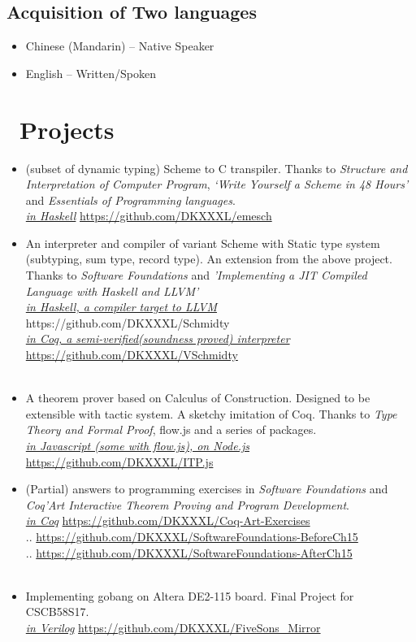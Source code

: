 \documentclass{resume}
\begin{document}
\subsection{\textbf{Acquisition of Two languages}}
\begin{itemize}
\item Chinese (Mandarin) – Native Speaker
\item English – Written/Spoken
\end{itemize}


\section{\faCogs\ Projects}
\begin{itemize}
\item (subset of dynamic typing) Scheme to C transpiler. Thanks to \textit{Structure and Interpretation of Computer Program}, \textit{‘Write Yourself a Scheme in 48 Hours’} and \textit{Essentials of Programming languages}. \\
\textit{\underline{in Haskell}} \hfill \url{https://github.com/DKXXXL/emesch}
\\
\item An interpreter and compiler of variant Scheme with Static type system (subtyping, sum type, record type). An extension from the above project. Thanks to \textit{Software Foundations} and \textit{'Implementing a JIT Compiled Language with Haskell and LLVM'} \\
\textit{\underline{in Haskell, a compiler target to LLVM}} \hfill https://github.com/DKXXXL/Schmidty \\
\textit{\underline{in Coq, a semi-verified(soundness proved) interpreter}} \hfill \url{https://github.com/DKXXXL/VSchmidty} \\
\\
\item A theorem prover based on Calculus of Construction. Designed to be extensible with tactic system. A sketchy imitation of Coq. Thanks to \textit{Type Theory and Formal Proof}, flow.js and a series of packages.\\
\textit{\underline{in Javascript (some with flow.js), on Node.js}} \hfill \url{https://github.com/DKXXXL/ITP.js}
\\
\item (Partial) answers to programming exercises in \textit{Software Foundations} and \textit{Coq’Art Interactive Theorem Proving and Program Development}. \\
\textit{\underline{in Coq}} \hfill \url{https://github.com/DKXXXL/Coq-Art-Exercises} \\
..  \hfill \url{https://github.com/DKXXXL/SoftwareFoundations-BeforeCh15} \\
..  \hfill \url{https://github.com/DKXXXL/SoftwareFoundations-AfterCh15} \\
\\
\item Implementing gobang on Altera DE2-115 board. Final Project for CSCB58S17. \\
\textit{\underline{in Verilog}} 
\hfill \url{https://github.com/DKXXXL/FiveSons\_Mirror}

\end{itemize}
\end{document}
